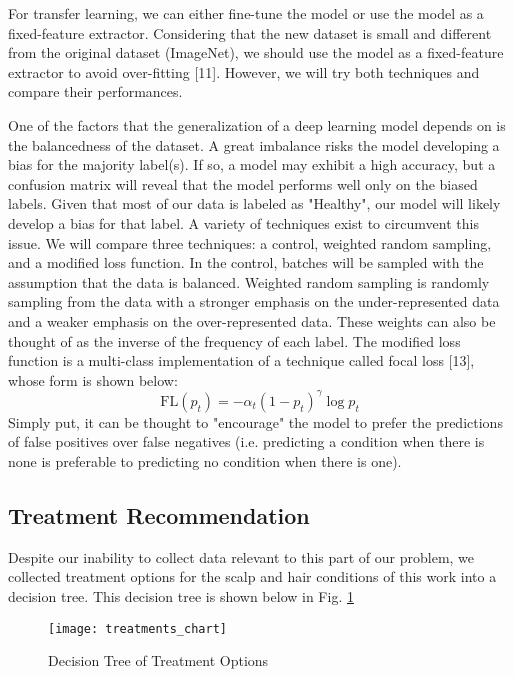 \documentclass[10pt,twocolumn,letterpaper]{article}
\begin{document}
For transfer learning, we can either fine-tune the model or use the model as a fixed-feature extractor. Considering that the new dataset is small and different from the original dataset (ImageNet), we should use the model as a fixed-feature extractor to avoid over-fitting [11]. However, we will try both techniques and compare their performances.

One of the factors that the generalization of a deep learning model depends on is the balancedness of the dataset. A great imbalance risks the model developing a bias for the majority label(s). If so, a model may exhibit a high accuracy, but a confusion matrix will reveal that the model performs well only on the biased labels. Given that most of our data is labeled as "Healthy", our model will likely develop a bias for that label. A variety of techniques exist to circumvent this issue. We will compare three techniques: a control, weighted random sampling, and a modified loss function. In the control, batches will be sampled with the assumption that the data is balanced. Weighted random sampling is randomly sampling from the data with a stronger emphasis on the under-represented data and a weaker emphasis on the over-represented data. These weights can also be thought of as the inverse of the frequency of each label. The modified loss function is a multi-class implementation of a technique called focal loss [13], whose form is shown below:
\begin{equation}
\label{eqn:focal_loss}
\text{FL}(p_t)=-\alpha_t(1-p_t)^\gamma\log{p_t}
\end{equation}
Simply put, it can be thought to "encourage" the model to prefer the predictions of false positives over false negatives (i.e. predicting a condition when there is none is preferable to predicting no condition when there is one).


\subsection{Treatment Recommendation}
Despite our inability to collect data relevant to this part of our problem, we collected treatment options for the scalp and hair conditions of this work into a decision tree. This decision tree is shown below in Fig. \ref{fig:dtto}

\begin{figure}[htp]
    \centering
    \texttt{[image: treatments\_chart]}
    \caption{Decision Tree of Treatment Options}
    \label{fig:dtto}
\end{figure}
\end{document}
